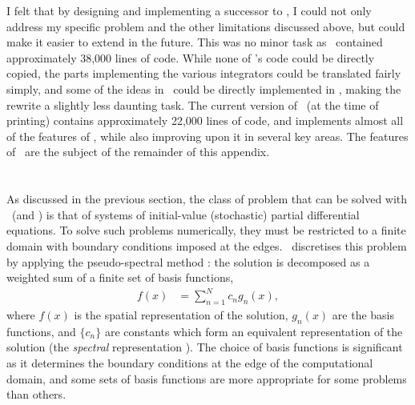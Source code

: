 I felt that by designing and implementing a successor to \XMDS, I could not only address my specific problem and the other limitations discussed above, but could make it easier to extend in the future.  This was no minor task as \XMDS\ contained approximately 38,000 lines of code.  While none of \XMDS's code could be directly copied, the parts implementing the various integrators could be translated fairly simply, and some of the ideas in \XMDS\ could be directly implemented in \xpdeint, making the rewrite a slightly less daunting task.  The current version of \xpdeint\ (at the time of printing) contains approximately 22,000 lines of code, and implements almost all of the features of \XMDS, while also improving upon it in several key areas.  The features of \xpdeint\ are the subject of the remainder of this appendix.

\section{\xpdeint}

As discussed in the previous section, the class of problem that can be solved with \xpdeint\ (and \XMDS) is that of systems of initial-value (stochastic) partial differential equations.  To solve such problems numerically, they must be restricted to a finite domain with boundary conditions imposed at the edges.  \xpdeint\ discretises this problem by applying the pseudo-spectral method \citep{SpectralMethods}: the solution is decomposed as a weighted sum of a finite set of basis functions,
\begin{align}
    f(x) &= \sum_{n=1}^{N} c_n g_n(x),
\end{align}
where $f(x)$ is the spatial representation of the solution, $g_n(x)$ are the basis functions, and $\{c_n\}$ are constants which form an equivalent representation of the solution (the \emph{spectral} representation \citep{SpectralMethods}).  The choice of basis functions is significant as it determines the boundary conditions at the edge of the computational domain, and some sets of basis functions are more appropriate for some problems than others.  

